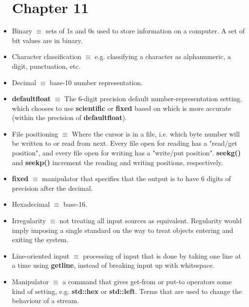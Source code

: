 \documentclass[12pt]{article}
\begin{document}
\begin{itemize}
\section*{Chapter 11}

\item Binary $\equiv$ sets of 1s and 0s used to store information on a computer. A set of bit values are in binary.

\item Character classification $\equiv$ e.g. classifying a character as alphanumeric, a digit, punctuation, etc.

\item Decimal $\equiv$ base-10 number representation.

\item \textbf{defaultfloat} $\equiv$ The 6-digit precision default number-representation setting, which chooses to use \textbf{scientific} or \textbf{fixed} based on which is more accurate (within the precision of \textbf{defaultfloat}).

\item File positioning $\equiv$ Where the cursor is in a file, i.e. which byte number will be written to or read from next. Every file open for reading has a "read/get position", and every file open for writing has a "write/put position". \textbf{seekg()} and \textbf{seekp()} increment the reading and writing positions, respectively.

\item \textbf{fixed} $\equiv$ manipulator that specifies that the output is to have 6 digits of precision after the decimal.

\item Hexadecimal $\equiv$ base-16.

\item Irregularity $\equiv$ not treating all input sources as equivalent. Regularity would imply imposing a single standard on the way to treat objects entering and exiting the system.

\item Line-oriented input $\equiv$ processing of input that is done by taking one line at a time using \textbf{getline}, instead of breaking input up with whitespace.

\item Manipulator $\equiv$ a command that gives get-from or put-to operators some kind of setting, e.g. \textbf{std::hex} or \textbf{std::left}. Terms that are used to change the behaviour of a stream.


\end{itemize}
\end{document}
